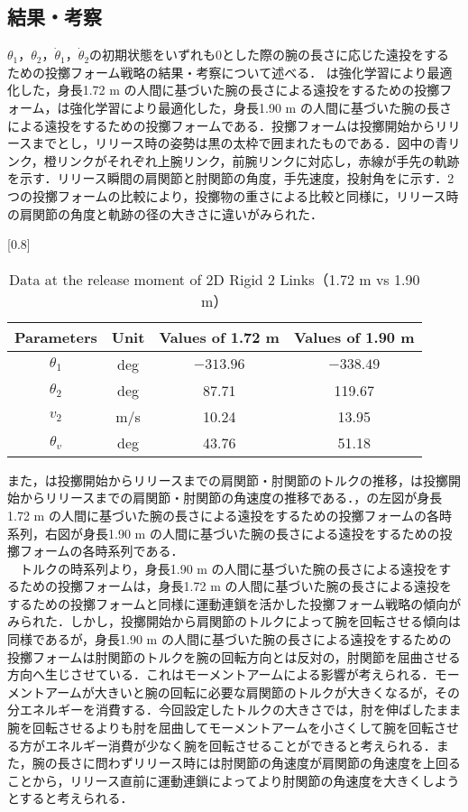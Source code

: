 \begin{small}
\subsection{結果・考察}
$\theta_{1}$，$\theta_{2}$，$\dot{\theta}_{1}$，$\dot{\theta}_{2}$の初期状態をいずれも0とした際の腕の長さに応じた遠投をするための投擲フォーム戦略の結果・考察について述べる．
は強化学習により最適化した，身長1.72 m の人間に基づいた腕の長さによる遠投をするための投擲フォーム，は強化学習により最適化した，身長1.90 m の人間に基づいた腕の長さによる遠投をするための投擲フォームである．投擲フォームは投擲開始からリリースまでとし，リリース時の姿勢は黒の太枠で囲まれたものである．図中の青リンク，橙リンクがそれぞれ上腕リンク，前腕リンクに対応し，赤線が手先の軌跡を示す．リリース瞬間の肩関節と肘関節の角度，手先速度，投射角をに示す．2つの投擲フォームの比較により，投擲物の重さによる比較と同様に，リリース時の肩関節の角度と軌跡の径の大きさに違いがみられた．
\begin{table}[tb]
  \begin{center}
    \caption{Data at the release moment of 2D Rigid 2 Links（1.72 m vs 1.90 m）}
    \scalebox{0.8}[0.8]{
    \begin{tabular}{c|c|c|c}
      \hline
      Parameters & Unit & Values of 1.72 m & Values of 1.90 m \\
      \hline
      $\theta_{1}$ & deg & $-313.96$ & $-338.49$ \\
      $\theta_{2}$ & deg & 87.71 & 119.67 \\
      $v_{2}$ & m/s & 10.24 & 13.95 \\
      $\theta_{v}$ & deg & 43.76 & 51.18 \\
      \hline
    \end{tabular}
    }
  \end{center}
\end{table}
また，は投擲開始からリリースまでの肩関節・肘関節のトルクの推移，は投擲開始からリリースまでの肩関節・肘関節の角速度の推移である．，の左図が身長1.72 m の人間に基づいた腕の長さによる遠投をするための投擲フォームの各時系列，右図が身長1.90 m の人間に基づいた腕の長さによる遠投をするための投擲フォームの各時系列である．\\
　トルクの時系列より，身長1.90 m の人間に基づいた腕の長さによる遠投をするための投擲フォームは，身長1.72 m の人間に基づいた腕の長さによる遠投をするための投擲フォームと同様に運動連鎖を活かした投擲フォーム戦略の傾向がみられた．しかし，投擲開始から肩関節のトルクによって腕を回転させる傾向は同様であるが，身長1.90 m の人間に基づいた腕の長さによる遠投をするための投擲フォームは肘関節のトルクを腕の回転方向とは反対の，肘関節を屈曲させる方向へ生じさせている．これはモーメントアームによる影響が考えられる．モーメントアームが大きいと腕の回転に必要な肩関節のトルクが大きくなるが，その分エネルギーを消費する．今回設定したトルクの大きさでは，肘を伸ばしたまま腕を回転させるよりも肘を屈曲してモーメントアームを小さくして腕を回転させる方がエネルギー消費が少なく腕を回転させることができると考えられる．また，腕の長さに問わずリリース時には肘関節の角速度が肩関節の角速度を上回ることから，リリース直前に運動連鎖によってより肘関節の角速度を大きくしようとすると考えられる．

\end{small}
